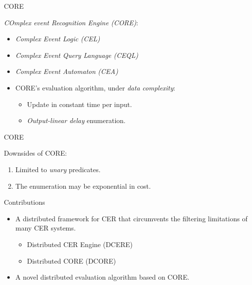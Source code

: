 \documentclass[xcolor=pdftex,dvipsnames,table]{beamer}
\begin{document}

\begin{frame}{CORE}
  \begin{block}{}
   \emph{COmplex event Recognition Engine (CORE)\cite{core}}:
   \begin{itemize}
     \item \emph{Complex Event Logic (CEL)}
     \pause
     \item \emph{Complex Event Query Language (CEQL)}
     \pause
     \item \emph{Complex Event Automaton (CEA)}
     \pause
     \item CORE's evaluation algorithm, under \emph{data complexity}:
      \begin{itemize}
        \item Update in constant time per input.
        \pause
        \item \emph{Output-linear delay} enumeration.
      \end{itemize}
   \end{itemize}
 \end{block}
\end{frame}

\begin{frame}{CORE}
  \begin{block}{}
    Downsides of CORE:
   \begin{enumerate}
     \pause
     \item Limited to \emph{unary} predicates.
     \pause
     \item The enumeration may be exponential in cost.
   \end{enumerate}
 \end{block}
\end{frame}


\begin{frame}{Contributions}
  \begin{block}{}
   \begin{itemize}
     \item A distributed framework for CER that circumvents the filtering limitations of many CER systems.
      \begin{itemize}
        \pause
        \item Distributed CER Engine (DCERE)
        \pause
        \item Distributed CORE (DCORE)
      \end{itemize}
     \pause
     \item A novel distributed evaluation algorithm based on CORE.
   \end{itemize}
 \end{block}
\end{frame}
\end{document}
